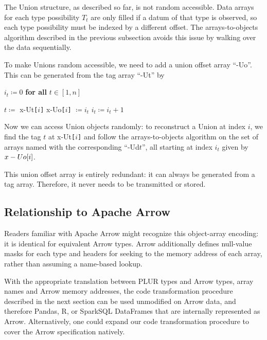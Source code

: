 \documentclass[10pt, conference, compsocconf]{IEEEtran}
\begin{document}
The Union structure, as described so far, is not random accessible. Data arrays for each type possibility $T_t$ are only filled if a datum of that type is observed, so each type possibility must be indexed by a different offset. The arrays-to-objects algorithm described in the previous subsection avoids this issue by walking over the data sequentially.

To make Unions random accessible, we need to add a union offset array ``-Uo''. This can be generated from the tag array ``-Ut'' by
\begin{algorithmic}
\vspace{0.15 cm}
\STATE $i_t \coloneqq 0$ {\bf for all} $t \in [1, n]$

\vspace{0.15 cm}
\STATE $t \coloneqq$ \mbox{x-Ut}{\tt [}$i${\tt ]}
\STATE \mbox{x-Uo}{\tt [}$i${\tt ]} $\coloneqq i_t$
\STATE $i_t \coloneqq i_t + 1$
\ENDFOR
\end{algorithmic}

Now we can access Union objects randomly: to reconstruct a Union at index $i$, we find the tag $t$ at x-Ut{\tt [}$i${\tt ]} and follow the arrays-to-objects algorithm on the set of arrays named with the corresponding ``-Ud$t$'', all starting at index $i_t$ given by $\mbox{x-Uo{\tt [}}i\mbox{\tt]}$.

This union offset array is entirely redundant: it can always be generated from a tag array. Therefore, it never needs to be transmitted or stored.

\subsection{Relationship to Apache Arrow}

Readers familiar with Apache Arrow might recognize this object-array encoding\cite{arrow-layout}: it is identical for equivalent Arrow types. Arrow additionally defines null-value masks for each type and headers for seeking to the memory address of each array, rather than assuming a name-based lookup.

With the appropriate translation between PLUR types and Arrow types, array names and Arrow memory addresses, the code transformation procedure described in the next section can be used unmodified on Arrow data, and therefore Pandas\cite{pandas}, R\cite{R}, or SparkSQL\cite{sparksql} DataFrames that are internally represented as Arrow. Alternatively, one could expand our code transformation procedure to cover the Arrow specification natively.
\end{document}
